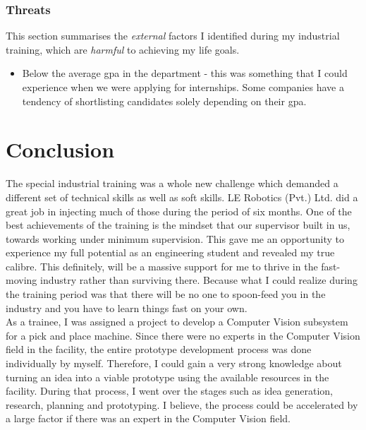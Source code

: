 \documentclass[a4paper,12pt]{report}
\begin{document}
\subsection{Threats}
This section summarises the \textit{external} factors I identified during my industrial training, which are \textit{harmful} to achieving my life goals.
\begin{itemize}
	\item Below the average \ac{gpa} in the department - this was something that I could experience when we were applying for internships. Some companies have a tendency of shortlisting candidates solely depending on their \ac{gpa}.
	
\end{itemize} 







\chapter{Conclusion}


The special industrial training was a whole new challenge which demanded a different set of technical skills as well as soft skills. LE Robotics (Pvt.) Ltd. did a great job in injecting much of those during the period of six months. One of the best achievements of the training is the mindset that our supervisor built in us, towards working under minimum supervision. This gave me an opportunity to experience my full potential as an engineering student and revealed my true calibre. This definitely, will be a massive support for me to thrive in the fast-moving industry rather than surviving there. Because what I could realize during the training period was that there will be no one to spoon-feed you in the industry and you have to learn things fast on your own.\\

As a trainee, I was assigned a project to develop a Computer Vision subsystem for a pick and place machine. Since there were no experts in the Computer Vision field in the facility, the entire prototype development process was done individually by myself. Therefore, I could gain a very strong knowledge about turning an idea into a viable prototype using the available resources in the facility. During that process, I went over the stages such as idea generation, research, planning and prototyping. I believe, the process could be accelerated by a large factor if there was an expert in the Computer Vision field.\\
\end{document}

